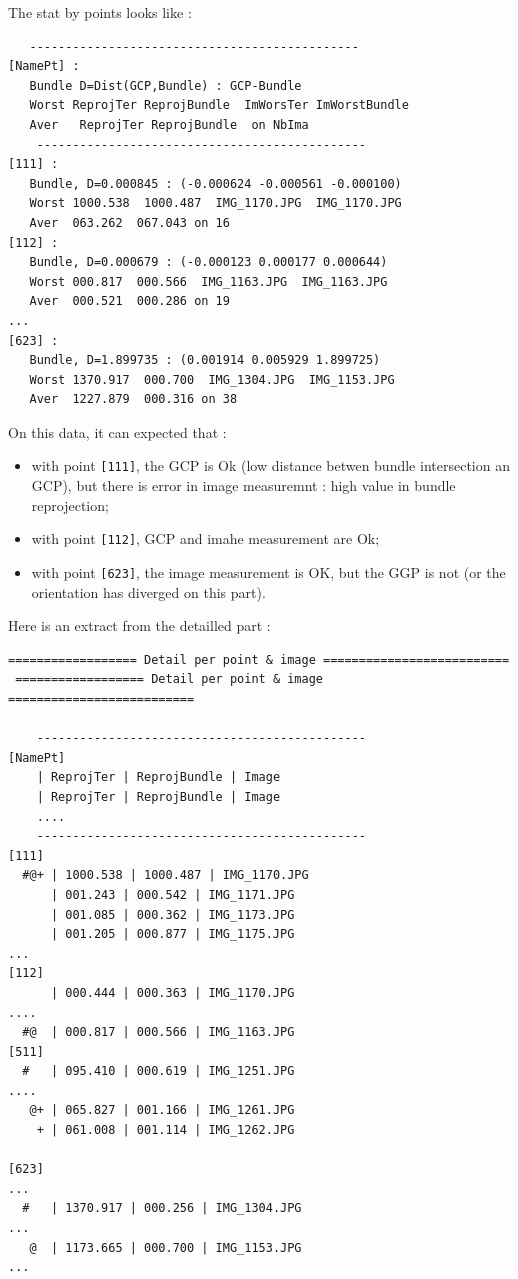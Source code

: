 The stat by points looks like :


\begin{verbatim}
   ----------------------------------------------
[NamePt] :
   Bundle D=Dist(GCP,Bundle) : GCP-Bundle
   Worst ReprojTer ReprojBundle  ImWorsTer ImWorstBundle
   Aver   ReprojTer ReprojBundle  on NbIma
    ----------------------------------------------
[111] :
   Bundle, D=0.000845 : (-0.000624 -0.000561 -0.000100)
   Worst 1000.538  1000.487  IMG_1170.JPG  IMG_1170.JPG
   Aver  063.262  067.043 on 16
[112] :
   Bundle, D=0.000679 : (-0.000123 0.000177 0.000644)
   Worst 000.817  000.566  IMG_1163.JPG  IMG_1163.JPG
   Aver  000.521  000.286 on 19
...
[623] :
   Bundle, D=1.899735 : (0.001914 0.005929 1.899725)
   Worst 1370.917  000.700  IMG_1304.JPG  IMG_1153.JPG
   Aver  1227.879  000.316 on 38
\end{verbatim}


On this data, it can expected that :

\begin{itemize}
   \item with point {\tt [111]}, the GCP is Ok (low distance betwen bundle intersection an GCP),
         but there is error in image measuremnt : high value in bundle reprojection;

   \item with point {\tt [112]}, GCP and imahe measurement are Ok;

   \item with point {\tt [623]}, the image measurement is OK, but the GGP is not (or the orientation
         has diverged on this part).
\end{itemize}

Here is an extract from the detailled part :

\begin{verbatim}
================== Detail per point & image ==========================
 ================== Detail per point & image ==========================

    ----------------------------------------------
[NamePt]
    | ReprojTer | ReprojBundle | Image
    | ReprojTer | ReprojBundle | Image
    ....
    ----------------------------------------------
[111]
  #@+ | 1000.538 | 1000.487 | IMG_1170.JPG
      | 001.243 | 000.542 | IMG_1171.JPG
      | 001.085 | 000.362 | IMG_1173.JPG
      | 001.205 | 000.877 | IMG_1175.JPG
...
[112]
      | 000.444 | 000.363 | IMG_1170.JPG
....
  #@  | 000.817 | 000.566 | IMG_1163.JPG
[511]
  #   | 095.410 | 000.619 | IMG_1251.JPG
....
   @+ | 065.827 | 001.166 | IMG_1261.JPG
    + | 061.008 | 001.114 | IMG_1262.JPG

[623]
...
  #   | 1370.917 | 000.256 | IMG_1304.JPG
...
   @  | 1173.665 | 000.700 | IMG_1153.JPG
...
\end{verbatim}

